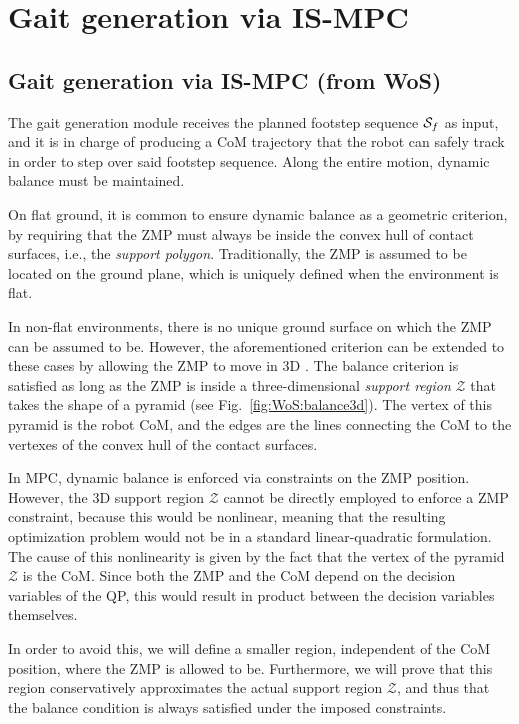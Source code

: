 \chapter{Gait generation via IS-MPC}
\section{Gait generation via IS-MPC (from WoS)}
\label{sec:WoS:offlineCase:GaitGeneration}
The gait generation module receives the planned footstep sequence ${\cal S}_f$ as input, and it is in charge of producing a CoM trajectory that the robot can safely track in order to step over said footstep sequence. Along the entire motion, dynamic balance must be maintained.

On flat ground, it is common to ensure dynamic balance as a geometric criterion, by requiring that the ZMP must always be inside the convex hull of contact surfaces, i.e., the \emph{support polygon}. Traditionally, the ZMP is assumed to be located on the ground plane, which is uniquely defined when the environment is flat.

In non-flat environments, there is no unique ground surface on which the ZMP can be assumed to be. However, the aforementioned criterion can be extended to these cases by allowing the ZMP to move in 3D \cite{SuImYaCa:2021}. The balance criterion is satisfied as long as the ZMP is inside a three-dimensional \emph{support region} $\mathcal{Z}$ that takes the shape of a pyramid (see Fig.~\ref{fig:WoS:balance3d}). The vertex of this pyramid is the robot CoM, and the edges are the lines connecting the CoM to the vertexes of the convex hull of the contact surfaces.

In MPC, dynamic balance is enforced via constraints on the ZMP position. However, the 3D support region $\mathcal{Z}$ cannot be directly employed to enforce a ZMP constraint, because this would be nonlinear, meaning that the resulting optimization problem would not be in a standard linear-quadratic formulation. The cause of this nonlinearity is given by the fact that the vertex of the pyramid $\mathcal{Z}$ is the CoM. Since both the ZMP and the CoM depend on the decision variables of the QP, this would result in product between the decision variables themselves.

In order to avoid this, we will define a smaller region, independent of the CoM position, where the ZMP is allowed to be. Furthermore, we will prove that this region conservatively approximates the actual support region $\mathcal{Z}$, and thus that the balance condition is always satisfied under the imposed constraints.

